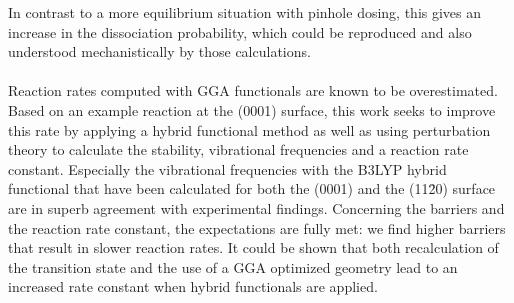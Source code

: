 \documentclass[11pt,DIV=13,BCOR=5mm,a4paper,headinclude]{scrbook}
\begin{document}
In contrast to a more equilibrium situation with pinhole dosing, this gives an increase in the dissociation probability, which could be reproduced and also understood mechanistically by those calculations.
\\\\
Reaction rates computed with GGA functionals are known to be overestimated.
Based on an example reaction at the (0001) surface, this work seeks to improve this rate by applying a hybrid functional method as well as using perturbation theory to calculate the stability, vibrational frequencies and a reaction rate constant.
Especially the vibrational frequencies with the B3LYP hybrid functional that have been calculated for both the (0001) and the (11\=20) surface are in superb agreement with experimental findings.
Concerning the barriers and the reaction rate constant, the expectations are fully met: we find higher barriers that result in slower reaction rates.
It could be shown that both recalculation of the transition state and the use of a GGA optimized geometry lead to an increased rate constant when hybrid functionals are applied.

\end{document}
